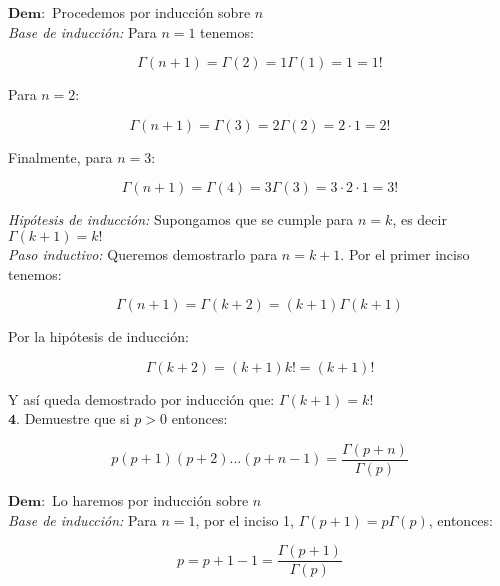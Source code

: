 $\mathbf{Dem:}$ Procedemos por inducción sobre $n$\\

\textit{Base de inducción:} Para $n=1$ tenemos:

\begin{equation*}
    \Gamma(n+1)= \Gamma (2)= 1 \Gamma (1)= 1= 1!
\end{equation*}

Para $n=2$: 

\begin{equation*}
    \Gamma (n+1)= \Gamma (3)= 2 \Gamma (2)= 2 \cdot 1= 2!
\end{equation*}

Finalmente, para $n=3$:

\begin{equation*}
    \Gamma (n+1)= \Gamma (4)= 3 \Gamma (3)= 3 \cdot 2 \cdot 1= 3!
\end{equation*}

\textit{Hipótesis de inducción:} Supongamos que se cumple para $n=k$, es decir $\Gamma (k+1)= k!$\\

\textit{Paso inductivo:} Queremos demostrarlo para $n=k+1$. Por el primer inciso tenemos:

\begin{equation*}
    \Gamma (n+1)= \Gamma (k+2)= (k+1) \Gamma (k+1)
\end{equation*}

Por la hipótesis de inducción:

\begin{equation*}
    \Gamma (k+2)= (k+1)k!= (k+1)!
\end{equation*}

Y así queda demostrado por inducción que: $\Gamma (k+1)= k!$\\

$\mathbf{4.}$ Demuestre que si $p > 0$ entonces: 

\begin{equation*}
    p(p+1)(p+2)...(p+n-1)= \frac{\Gamma (p+n)}{\Gamma (p)}
\end{equation*}

$\mathbf{Dem:}$ Lo haremos por inducción sobre $n$\\

\textit{Base de inducción:} Para $n=1$, por el inciso 1, $\Gamma(p+1)= p \Gamma (p)$, entonces: 

\begin{equation*}
    p= p+1-1= \frac{\Gamma (p+1)}{\Gamma (p)}
\end{equation*}


